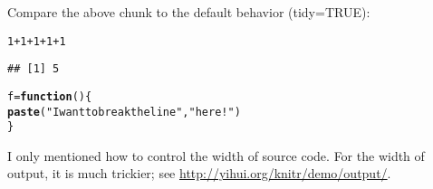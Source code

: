 \documentclass{article}\usepackage[]{graphicx}\usepackage[]{color}
\makeatletter
\newcommand{\hlnum}[1]{\textcolor[rgb]{0.686,0.059,0.569}{#1}}%
\newcommand{\hlstr}[1]{\textcolor[rgb]{0.192,0.494,0.8}{#1}}%
\newcommand{\hlopt}[1]{\textcolor[rgb]{0,0,0}{#1}}%
\newcommand{\hlstd}[1]{\textcolor[rgb]{0.345,0.345,0.345}{#1}}%
\newcommand{\hlkwa}[1]{\textcolor[rgb]{0.161,0.373,0.58}{\textbf{#1}}}%
\newcommand{\hlkwb}[1]{\textcolor[rgb]{0.69,0.353,0.396}{#1}}%
\newcommand{\hlkwd}[1]{\textcolor[rgb]{0.737,0.353,0.396}{\textbf{#1}}}%
\newenvironment{kframe}{%
 \def\at@end@of@kframe{}%
 \ifinner\ifhmode%
  \def\at@end@of@kframe{\end{minipage}}%
  \begin{minipage}{\columnwidth}%
 \fi\fi%
 \def\FrameCommand##1{\hskip\@totalleftmargin \hskip-\fboxsep
 \colorbox{shadecolor}{##1}\hskip-\fboxsep
     \hskip-\linewidth \hskip-\@totalleftmargin \hskip\columnwidth}%
 \MakeFramed {\advance\hsize-\width
   \@totalleftmargin\z@ \linewidth\hsize
   \@setminipage}}%
 {\par\unskip\endMakeFramed%
 \at@end@of@kframe}
\newenvironment{knitrout}{}{} %
\makeatother
\begin{document}
Compare the above chunk to the default behavior (tidy=TRUE):

\begin{knitrout}
\color{fgcolor}\begin{kframe}
\begin{alltt}
\hlnum{1} \hlopt{+} \hlnum{1} \hlopt{+} \hlnum{1} \hlopt{+} \hlnum{1} \hlopt{+} \hlnum{1}
\end{alltt}
\begin{verbatim}
## [1] 5
\end{verbatim}
\begin{alltt}
\hlstd{f} \hlkwb{=} \hlkwa{function}\hlstd{() \{}
    \hlkwd{paste}\hlstd{(}\hlstr{"I want to break the line"}\hlstd{,} \hlstr{"here!"}\hlstd{)}
\hlstd{\}}
\end{alltt}
\end{kframe}
\end{knitrout}

I only mentioned how to control the width of source code. For the width of output, it is much trickier; see \url{http://yihui.org/knitr/demo/output/}.
\end{document}
